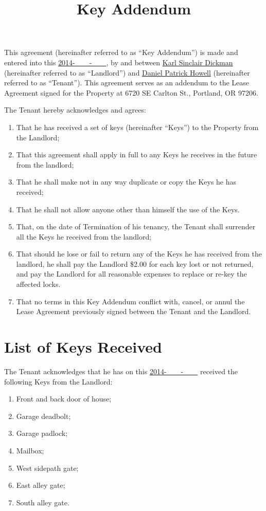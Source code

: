 \documentclass{amsart}
\title{Key Addendum}
\begin{document}
\maketitle
This agreement (hereinafter referred to as ``Key Addendum'') is made and entered
into this \underline{2014-\ \ \ \ -\ \ \ \ }, by and between \underline{Karl
Sinclair Dickman} (hereinafter referred to as ``Landlord'') and
\underline{Daniel Patrick Howell} (hereinafter referred to as ``Tenant''). This
agreement serves as an addendum to the Lease Agreement signed for the Property
at 6720 SE Carlton St., Portland, OR 97206.

The Tenant hereby acknowledges and agrees:
\begin{enumerate}
    \item That he has received a set of keys (hereinafter ``Keys'') to the Property
        from the Landlord;
    \item That this agreement shall apply in full to any Keys he receives in the
        future from the landlord;
    \item That he shall make not in any way duplicate or copy the Keys he has
        received;
    \item That he shall not allow anyone other than himself the use of the Keys.
    \item That, on the date of Termination of his tenancy, the Tenant shall
        surrender all the Keys he received from the landlord;
    \item That should he lose or fail to return any of the Keys he has received
        from the landlord, he shall pay the Landlord \$2.00 for each key lost or
        not returned, and pay the Landlord for all reasonable expenses to
        replace or re-key the affected locks.
    \item That no terms in this Key Addendum conflict with, cancel, or annul the
        Lease Agreement previously signed between the Tenant and the Landlord.
\end{enumerate}
\section*{List of Keys Received}
The Tenant acknowledges that he has on this \underline{2014-\ \ \ \ -\ \ \ \ }
received the following Keys from the Landlord:
\begin{enumerate}
    \item Front and back door of house;
    \item Garage deadbolt;
    \item Garage padlock;
    \item Mailbox;
    \item West sidepath gate;
    \item East alley gate;
    \item South alley gate.
\end{enumerate}
\newpage
\end{document}
